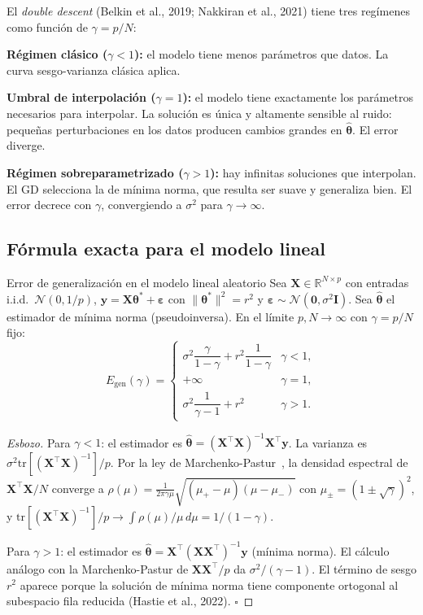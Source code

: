El \textit{double descent} (Belkin et al., 2019; Nakkiran et al., 2021)
tiene tres regímenes como función de $\gamma = p/N$:

\textbf{Régimen clásico ($\gamma < 1$):} el modelo tiene menos parámetros
que datos. La curva sesgo-varianza clásica aplica.

\textbf{Umbral de interpolación ($\gamma = 1$):} el modelo tiene
exactamente los parámetros necesarios para interpolar. La solución es
única y altamente sensible al ruido: pequeñas perturbaciones en los datos
producen cambios grandes en $\hat{\bm{\theta}}$. El error diverge.

\textbf{Régimen sobreparametrizado ($\gamma > 1$):} hay infinitas
soluciones que interpolan. El GD selecciona la de mínima norma, que
resulta ser suave y generaliza bien. El error decrece con $\gamma$,
convergiendo a $\sigma^2$ para $\gamma \to \infty$.

\subsection{Fórmula exacta para el modelo lineal}
\label{subsec:dd_formula}

\begin{teorema}{Error de generalización en el modelo lineal aleatorio}
\label{thm:double_descent}
Sea $\bm{X} \in \mathbb{R}^{N \times p}$ con entradas i.i.d.\
$\mathcal{N}(0,1/p)$, $\bm{y} = \bm{X}\bm{\theta}^* + \bm{\varepsilon}$
con $\|\bm{\theta}^*\|^2 = r^2$ y
$\bm{\varepsilon} \sim \mathcal{N}(\bm{0},\sigma^2\bm{I})$.
Sea $\hat{\bm{\theta}}$ el estimador de mínima norma (pseudoinversa).
En el límite $p, N \to \infty$ con $\gamma = p/N$ fijo:
\begin{equation}
  E_{\text{gen}}(\gamma) = \begin{cases}
    \sigma^2\dfrac{\gamma}{1-\gamma} + r^2\dfrac{1}{1-\gamma}
    & \gamma < 1, \\[8pt]
    +\infty & \gamma = 1, \\[4pt]
    \sigma^2\dfrac{1}{\gamma-1} + r^2
    & \gamma > 1.
  \end{cases}
  \label{eq:dd_formula}
\end{equation}
\end{teorema}

\begin{proof}[Esbozo]
Para $\gamma < 1$: el estimador es $\hat{\bm{\theta}} =
(\bm{X}^\top\bm{X})^{-1}\bm{X}^\top\bm{y}$. La varianza es
$\sigma^2\text{tr}[(\bm{X}^\top\bm{X})^{-1}]/p$. Por la ley de
Marchenko-Pastur~\cite{marchenko1967distribution}, la densidad espectral
de $\bm{X}^\top\bm{X}/N$ converge a
$\rho(\mu) = \frac{1}{2\pi\gamma\mu}\sqrt{(\mu_+-\mu)(\mu-\mu_-)}$ con
$\mu_\pm = (1\pm\sqrt{\gamma})^2$, y
$\text{tr}[(\bm{X}^\top\bm{X})^{-1}]/p \to
\int\rho(\mu)/\mu\,d\mu = 1/(1-\gamma)$.

Para $\gamma > 1$: el estimador es $\hat{\bm{\theta}} =
\bm{X}^\top(\bm{X}\bm{X}^\top)^{-1}\bm{y}$ (mínima norma). El cálculo
análogo con la Marchenko-Pastur de $\bm{X}\bm{X}^\top/p$ da
$\sigma^2/(\gamma-1)$. El término de sesgo $r^2$ aparece porque la
solución de mínima norma tiene componente ortogonal al subespacio fila
reducida (Hastie et al., 2022). $\square$
\end{proof}

